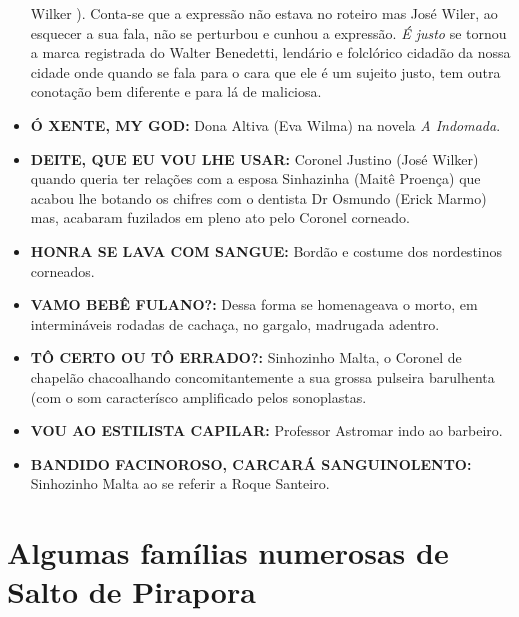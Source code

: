 \documentclass[12pt,brazil,]{book}
\begin{document}
\begin{itemize}
  Wilker ). Conta-se que a expressão não estava no roteiro mas José
  Wiler, ao esquecer a sua fala, não se perturbou e cunhou a expressão.
  \emph{É justo} se tornou a marca registrada do Walter Benedetti,
  lendário e folclórico cidadão da nossa cidade onde quando se fala para
  o cara que ele é um sujeito justo, tem outra conotação bem diferente e
  para lá de maliciosa.\\
\item
  \textbf{Ó XENTE, MY GOD:} Dona Altiva (Eva Wilma) na novela \emph{A
  Indomada}.\\
\item
  \textbf{DEITE, QUE EU VOU LHE USAR:} Coronel Justino (José Wilker)
  quando queria ter relações com a esposa Sinhazinha (Maitê Proença) que
  acabou lhe botando os chifres com o dentista Dr Osmundo (Erick Marmo)
  mas, acabaram fuzilados em pleno ato pelo Coronel corneado.\\
\item
  \textbf{HONRA SE LAVA COM SANGUE:} Bordão e costume dos nordestinos
  corneados.\\
\item
  \textbf{VAMO BEBÊ FULANO?:} Dessa forma se homenageava o morto, em
  intermináveis rodadas de cachaça, no gargalo, madrugada adentro.\\
\item
  \textbf{TÔ CERTO OU TÔ ERRADO?:} Sinhozinho Malta, o Coronel de
  chapelão chacoalhando concomitantemente a sua grossa pulseira
  barulhenta (com o som caracterísco amplificado pelos sonoplastas.\\
\item
  \textbf{VOU AO ESTILISTA CAPILAR:} Professor Astromar indo ao
  barbeiro.
\item
  \textbf{BANDIDO FACINOROSO, CARCARÁ SANGUINOLENTO:} Sinhozinho Malta
  ao se referir a Roque Santeiro.
\end{itemize}

\section{Algumas famílias numerosas de Salto de
Pirapora}\label{algumas-famuxedlias-numerosas-de-salto-de-pirapora}
\end{document}
